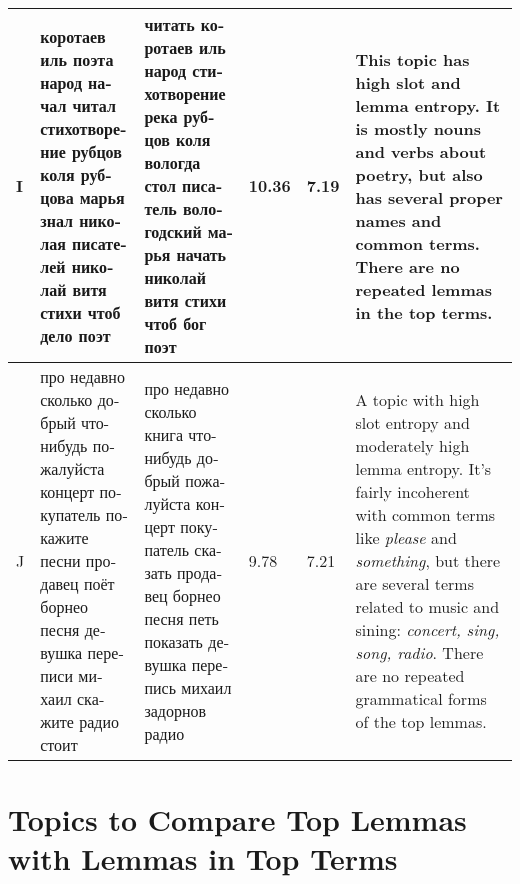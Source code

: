 \documentclass[11pt,a4paper]{article}
\begin{document}
\begin{landscape}
\begin{table*}[h!]
\begin{tabularx}{\textwidth}{|l|X|X|l|l|X|}
        I & \foreignlanguage{russian}{коротаев иль поэта народ начал читал стихотворение рубцов коля рубцова марья знал николая писателей николай витя стихи чтоб дело поэт} & \foreignlanguage{russian}{читать коротаев иль народ стихотворение река рубцов коля вологда стол писатель вологодский марья начать николай витя стихи чтоб бог поэт} & 10.36 & 7.19 & This topic has high slot and lemma entropy. It is mostly nouns and verbs about poetry, but also has several proper names and common terms. There are no repeated lemmas in the top terms. \\ \hline
        J & \foreignlanguage{russian}{про недавно сколько добрый что-нибудь пожалуйста концерт покупатель покажите песни продавец поёт борнео песня девушка переписи михаил скажите радио стоит} & \foreignlanguage{russian}{про недавно сколько книга что-нибудь добрый пожалуйста концерт покупатель сказать продавец борнео песня петь показать девушка перепись михаил задорнов радио} & 9.78 & 7.21 & A topic with high slot entropy and moderately high lemma entropy. It's fairly incoherent with common terms like \textit{please} and \textit{something}, but there are several terms related to music and sining: \textit{concert, sing, song, radio}. There are no repeated grammatical forms of the top lemmas. \\ \hline
    \end{tabularx}
\end{table*}
\pagebreak
\section{Topics to Compare Top Lemmas with Lemmas in Top Terms}
\label{sec:poststem_topics}
\begin{table*}[h!]
    \centering


\end{table*}
\end{landscape}
\end{document}
